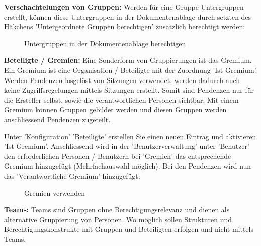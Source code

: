 \vspace{\baselineskip}

\textbf{Verschachtelungen von Gruppen:} Werden für eine Gruppe Untergruppen erstellt, können diese Untergruppen in der Dokumentenablage durch setzten des Häkchens 'Untergeordnete Gruppen berechtigen' zusätzlich berechtigt werden:

\begin{figure}[H]
\caption{Untergruppen in der Dokumentenablage berechtigen}
\end{figure}

\textbf{Beteiligte / Gremien:} Eine Sonderform von Gruppierungen ist das Gremium. Ein Gremium ist eine Organisation / Beteiligte mit der Zuordnung 'Ist Gremium'. Werden Pendenzen losgelöst von Sitzungen verwendet, werden dadurch auch keine Zugriffsregelungen mittels Sitzungen erstellt. Somit sind Pendenzen nur für die Ersteller selbst, sowie die verantwortlichen Personen sichtbar. Mit einem Gremium können Gruppen gebildet werden und diesen Gruppen werden anschliessend Pendenzen zugeteilt.

\pagebreak

Unter 'Konfiguration' 'Beteiligte' erstellen Sie einen neuen Eintrag und aktivieren 'Ist Gremium'. Anschliessend wird in der 'Benutzerverwaltung' unter 'Benutzer' den erforderlichen Personen / Benutzern bei 'Gremien' das entsprechende Gremium hinzugefügt (Mehrfachauswahl möglich). Bei den Pendenzen wird nun das 'Verantwortliche Gremium' hinzugefügt:

\begin{figure}[H]
\caption{Gremien verwenden}
\end{figure}

\textbf{Teams:} Teams sind Gruppen ohne Berechtigungsrelevanz und dienen als alternative Gruppierung von Personen. Wo möglich sollen Strukturen und Berechtigungskonstrukte mit Gruppen und Beteiligten erfolgen und nicht mittels Teams.